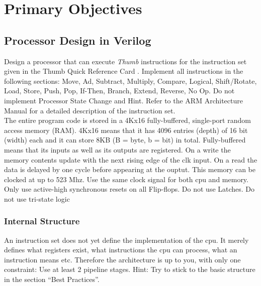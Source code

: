\section{Primary Objectives}

\subsection{Processor Design in Verilog}
Design a processor that can execute \textit{Thumb} instructions
 for the instruction set given in the Thumb Quick Reference Card \cite{QRC}. Implement all instructions in the following sections: Move, Ad, Subtract, Multiply, Compare, Logical, Shift/Rotate, Load, Store, Push, Pop, If-Then, Branch, Extend, Reverse, No Op. Do not implement Processor State Change and Hint. Refer to the ARM Architecture Manual \cite{ARMARM} for a detailed description of the instruction set. \\

The entire program code is stored in a 4Kx16 fully-buffered, single-port random access memory (RAM). 4Kx16 means that it has 4096 entries (depth) of 16 bit (width) each and it can store 8KB (B = byte, b = bit) in total. Fully-buffered means that its inputs as well as its outputs are registered. On a write the memory contents update with the next rising edge of the clk input. On a read the data is delayed by one cycle before appearing at the ouptut.
This memory can be clocked at up to 523 Mhz. Use the same clock signal for both cpu and memory. Only use active-high synchronous resets on all Flip-flops. Do not use Latches. Do not use tri-state logic

\subsubsection*{Internal Structure}
An instruction set does not yet define the implementation of the cpu. It merely defines what registers exist, what instructions the cpu can process, what an instruction means etc. Therefore the architecture is up to you, with only one constraint: Use at least 2 pipeline stages.
Hint: Try to stick to the basic structure in the section ``Best Practices''.

